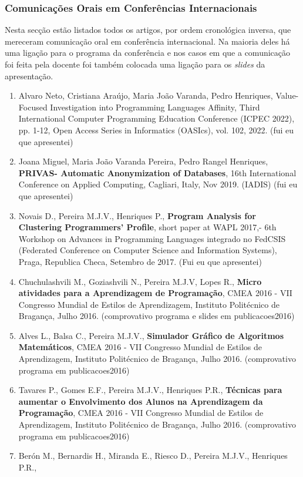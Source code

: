 \documentclass[11pt]{article}
\begin{document}
\subsubsection{Comunicações Orais em Conferências Internacionais}Nesta secção estão listados todos os artigos, por ordem cronológica inversa, que mereceram comunicação oral em conferência internacional.  Na maioria deles há uma ligação para o programa da conferência e nos casos em que a comunicação foi feita pela docente foi também colocada uma ligação para os {
\em{ slides}} da apresentação.
\begin{enumerate}
\item{Alvaro Neto, Cristiana Araújo, Maria João Varanda, Pedro Henriques, Value-Focused Investigation into Programming Languages Affinity, Third International Computer Programming Education Conference (ICPEC 2022), pp. 1-12, Open Access Series in Informatics (OASIcs), vol. 102, 2022. (fui eu que apresentei)}
\item{Joana Miguel, Maria João Varanda Pereira, Pedro Rangel Henriques, {
\bf{ PRIVAS- Automatic Anonymization of Databases}}, 16th International Conference on Applied Computing, Cagliari, Italy, Nov 2019. (IADIS) (fui eu que apresentei)}
\item{Novais D., Pereira M.J.V., Henriques P., {
\bf{ Program Analysis for Clustering Programmers' Profile}}, short paper at WAPL 2017,- 6th Workshop on Advances in Programming Languages integrado no FedCSIS (Federated Conference on Computer Science and Information Systems), Praga, Republica Checa, Setembro de 2017. (Fui eu que apresentei)}
\item{Chuchulashvili M., Goziashvili N., Pereira M.J.V, Lopes R., {
\bf{ Micro atividades para a Aprendizagem de Programação}}, CMEA 2016 - VII Congresso Mundial de Estilos de Aprendizagem, Instituto Politécnico de Bragança, Julho 2016. (comprovativo programa e slides em publicacoes2016)}
\item{Alves L., Balsa C., Pereira M.J.V., {
\bf{ Simulador Gráfico de Algoritmos Matemáticos}}, CMEA 2016 - VII Congresso Mundial de Estilos de Aprendizagem, Instituto Politécnico de Bragança, Julho 2016. (comprovativo programa em publicacoes2016)}
\item{Tavares P., Gomes E.F., Pereira M.J.V., Henriques P.R., {
\bf{ Técnicas para aumentar o Envolvimento dos Alunos na Aprendizagem da Programação}}, CMEA 2016 - VII Congresso Mundial de Estilos de Aprendizagem, Instituto Politécnico de Bragança, Julho 2016. (comprovativo programa em publicacoes2016)}
\item{Berón M., Bernardis H., Miranda E., Riesco D., Pereira M.J.V., Henriques P.R., {
}}
\end{enumerate}
\end{document}
